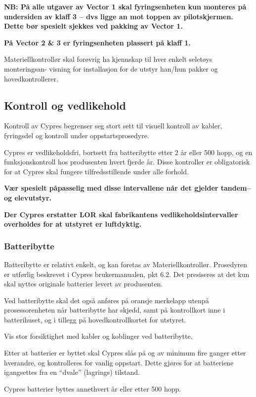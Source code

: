\textbf{NB: På alle utgaver av Vector 1 skal fyringsenheten kun monteres på undersiden av klaff 3 – dvs ligge an mot toppen av pilotskjermen. Dette bør spesielt sjekkes ved pakking av Vector 1.}

\textbf{På Vector 2 \& 3 er fyringsenheten plassert på klaff 1.}

Materiellkontrollør skal forøvrig ha kjennskap til hver enkelt seletøys monteringsan- visning for installasjon for de utstyr han/hun pakker og hovedkontrollerer.

\subsection{Kontroll og vedlikehold}
Kontroll av Cypres begrenser seg stort sett til visuell kontroll av kabler, fyringsdel og kontroll under oppstartsprosedyre.

Cypres er vedlikeholdsfri, bortsett fra batteribytte etter 2 år eller 500 hopp, og en funksjonskontroll hos produsenten hvert fjerde år. Disse kontroller er obligatorisk for at Cypres skal fungere tilfredsstillende under alle forhold.

\textbf{Vær spesielt påpasselig med disse intervallene når det gjelder tandem– og elevutstyr.}

\textbf{Der Cypres erstatter LOR skal fabrikantens vedlikeholdsintervaller overholdes for at utstyret er luftdyktig.}

\subsubsection{Batteribytte}
Batteribytte er relativt enkelt, og kan foretas av Materiellkontrollør. Prosedyren er utførlig beskrevet i Cypres brukermanualen, pkt 6.2. Det presiseres at det kun skal nyttes originale batterier levert av produsenten.

Ved batteribytte skal det også anføres på oransje merkelapp utenpå prosessorenheten når batteribytte har skjedd, samt på kontrollkort inne i batterihuset, og i tillegg på hovedkontrollkortet for utstyret.

Vis stor forsiktighet med kabler og koblinger ved batteribytte.

Etter at batterier er byttet skal Cypres slås på og av minimum fire ganger etter hverandre, og kontrolleres for vanlig oppstart. Dette gjøres for at batteriene igangsettes fra en ``dvale'' (lagrings) tilstand.

Cypres batterier byttes annethvert år eller etter 500 hopp.

